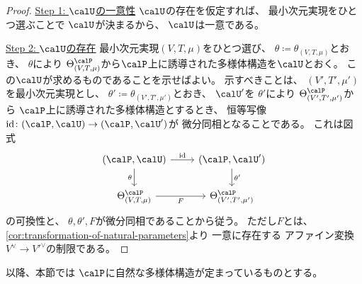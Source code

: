 \documentclass[report]{jlreq}
\begin{document}
\begin{proof}
    \uline{Step 1: $\calU$の一意性} \quad
    $\calU$の存在を仮定すれば、
    最小次元実現をひとつ選ぶことで
    $\calU$が決まるから、
    $\calU$は一意である。

    \uline{Step 2: $\calU$の存在} \quad
    最小次元実現$(V, T, \mu)$をひとつ選び、
    $\theta \coloneqq \theta_{(V, T, \mu)}$とおき、
    $\theta$により
    $\Theta^\calP_{(V, T, \mu)}$から$\calP$上に誘導された多様体構造を$\calU$とおく。
    この$\calU$が求めるものであることを示せばよい。
    示すべきことは、
    $(V', T', \mu')$を最小次元実現とし、
    $\theta' \coloneqq \theta_{(V', T', \mu')}$とおき、
    $\calU'$を
    $\theta'$により
    $\Theta^\calP_{(V', T', \mu')}$から
    $\calP$上に誘導された多様体構造とするとき、
    恒等写像$\id \colon (\calP, \calU) \to (\calP, \calU')$が
    微分同相となることである。
    これは図式
    \begin{equation}
        \begin{tikzcd}
            (\calP, \calU)
                \ar{d}[swap]{\theta}
                \ar{r}{\id}
                &(\calP, \calU')
                    \ar{d}{\theta'}
                \\
            \Theta^\calP_{(V, T, \mu)}
                \ar{r}[swap]{F}
                &\Theta^\calP_{(V', T', \mu')}
        \end{tikzcd}
    \end{equation}
    の可換性と、
    $\theta, \theta', F$が微分同相であることから従う。
    ただし$F$とは、
    \cref{cor:transformation-of-natural-parameters}より
    一意に存在する
    アファイン変換$V^\vee \to V'^\vee$の制限である。
\end{proof}

以降、本節では
$\calP$に自然な多様体構造が定まっているものとする。

\end{document}
